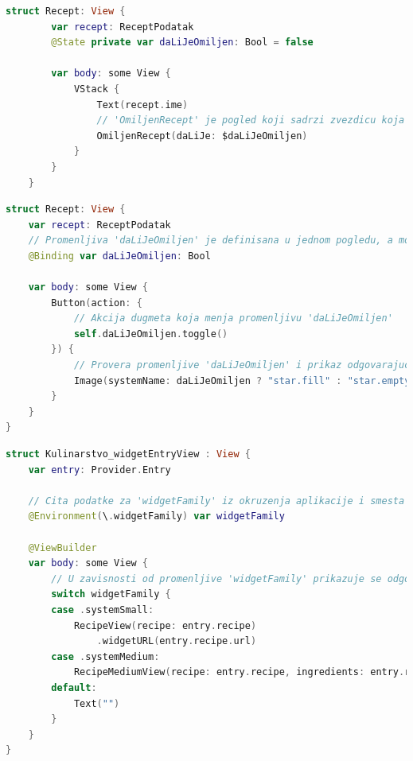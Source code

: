 \documentclass[12pt,oneside]{memoir}
\begin{document}
\begin{lstlisting}[caption=\textit{{Омотачи података - State}}, label={lst:Омотачи података - State}, language=Swift, frame=single]
    struct Recept: View {
        var recept: ReceptPodatak
        @State private var daLiJeOmiljen: Bool = false
        
        var body: some View {
            VStack {
                Text(recept.ime)
                // 'OmiljenRecept' je pogled koji sadrzi zvezdicu koja oznacava da li je recept medju omiljenima (puna zvezdica - jeste, prazna - nije)
                OmiljenRecept(daLiJe: $daLiJeOmiljen)
            }
        }
    }
\end{lstlisting}

\begin{lstlisting}[caption=\textit{{Омотачи података - Binding}}, label={lst:Омотачи података - Binding}, language=Swift, frame=single]
    struct Recept: View {
    var recept: ReceptPodatak
    // Promenljiva 'daLiJeOmiljen' je definisana u jednom pogledu, a moze se menjati u drugom
    @Binding var daLiJeOmiljen: Bool

    var body: some View {
        Button(action: {
            // Akcija dugmeta koja menja promenljivu 'daLiJeOmiljen'
            self.daLiJeOmiljen.toggle()
        }) {
            // Provera promenljive 'daLiJeOmiljen' i prikaz odgovarajuce slike
            Image(systemName: daLiJeOmiljen ? "star.fill" : "star.empty")
        }
    }
}
\end{lstlisting}

\begin{lstlisting}[caption=\textit{{Омотачи података - Environment}}, label={lst:Омотачи података - Environment}, language=Swift, frame=single]
    struct Kulinarstvo_widgetEntryView : View {
    var entry: Provider.Entry
    
    // Cita podatke za 'widgetFamily' iz okruzenja aplikacije i smesta ih u promenljivu 'widgetFamily'
    @Environment(\.widgetFamily) var widgetFamily
    
    @ViewBuilder
    var body: some View {
        // U zavisnosti od promenljive 'widgetFamily' prikazuje se odgovarajuci widget
        switch widgetFamily {
        case .systemSmall:
            RecipeView(recipe: entry.recipe)
                .widgetURL(entry.recipe.url)
        case .systemMedium:
            RecipeMediumView(recipe: entry.recipe, ingredients: entry.recipe.ingredients.count > 3 ? Array(entry.recipe.ingredients.dropLast(entry.recipe.ingredients.count - 3)) : entry.recipe.ingredients)
        default:
            Text("")
        }
    }
}
\end{lstlisting}
\end{document}

